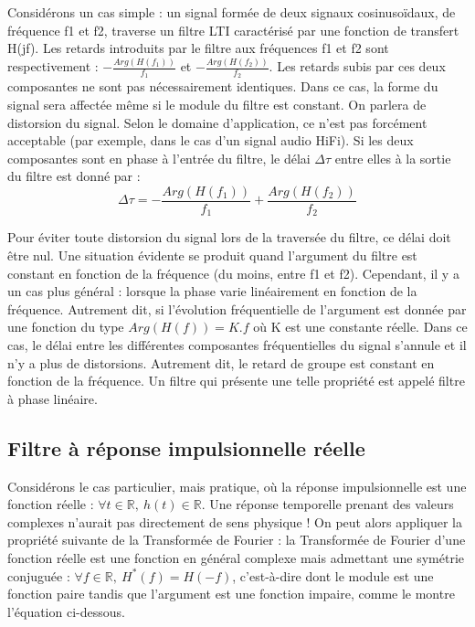 	Considérons un cas simple : un signal formée de deux signaux cosinusoïdaux, de fréquence f1 et f2, traverse un filtre LTI caractérisé par une fonction de transfert H(jf). Les retards introduits par le filtre aux fréquences f1 et f2 sont respectivement : $-\frac{Arg(H(f_1))}{f_1}$ et $-\frac{Arg(H(f_2))}{f_2}$. Les retards subis par ces deux composantes ne sont pas nécessairement identiques. Dans ce cas, la forme du signal sera affectée même si le module du filtre est constant. On parlera de distorsion du signal. Selon le domaine d'application, ce n'est pas forcément acceptable (par exemple, dans le cas d'un signal audio HiFi). 
	Si les deux composantes sont en phase à l'entrée du filtre, le délai $\Delta \tau$ entre elles à la sortie du filtre est donné par :
	\begin{equation*}
	\Delta \tau = -\frac{Arg(H(f_1))}{f_1}+\frac{Arg(H(f_2))}{f_2}
	\end{equation*} 
	
	Pour éviter toute distorsion du signal lors de la traversée du filtre, ce délai doit être nul. Une situation évidente se produit quand l'argument du filtre est constant en fonction de la fréquence (du moins, entre f1 et f2). Cependant, il y a un cas plus général : lorsque la phase varie linéairement en fonction de la fréquence. Autrement dit, si l'évolution fréquentielle de l'argument est donnée par une fonction du type $Arg(H(f))=K.f$ où K est une constante réelle. Dans ce cas, le délai entre les différentes composantes fréquentielles du signal s'annule et il n'y a plus de distorsions. Autrement dit, le retard de groupe est constant en fonction de la fréquence. Un filtre qui présente une telle propriété est appelé filtre à phase linéaire.  
	
	\vspace{1\baselineskip}
	
	\subsection{Filtre à réponse impulsionnelle réelle}
	Considérons le cas particulier, mais pratique, où la réponse impulsionnelle est une fonction réelle : $ \forall t \in \mathbb{R},~h(t) \in \mathbb{R}$. Une réponse temporelle prenant des valeurs complexes n’aurait pas directement de sens physique ! On peut alors appliquer la propriété suivante de la Transformée de Fourier : la Transformée de Fourier d’une fonction réelle est une fonction en général complexe mais admettant une symétrie conjuguée : $\forall f \in \mathbb{R},~H^{*}(f) = H(-f)$, c'est-à-dire dont le module est une fonction paire tandis que l’argument est une fonction impaire, comme le montre l'équation ci-dessous. 
	
